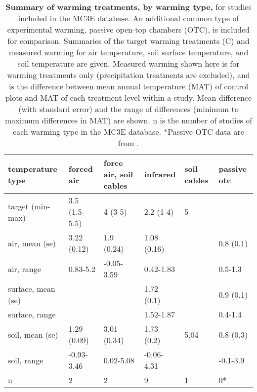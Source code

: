 \documentclass{article}
\begin{document}
\clearpage
\begin{footnotesize} 

\begin{table}[ht]
\centering
\caption{\textbf{Summary of warming treatments, by warming type,} for studies included in the MC3E database. An additional common type of experimental warming, passive open-top chambers (OTC), is included for comparison. Summaries of the target warming treatments (\degree C) and measured warming for air temperature, soil surface temperature, and soil temperature are given. Measured warming shown here is for warming treatments only (precipitation treatments are excluded), and is the difference between mean annual temperature (MAT) of control plots and MAT of each treatment level within a study. Mean difference (with standard error) and the range of differences (minimum to maximum differences in MAT) are shown. n is the number of studies of each warming type in the MC3E database. *Passive OTC data are from \cite{bokhorst2013}.} 
\label{tab:warmtreats}
\begingroup\footnotesize
\begin{tabular}{|p{}p{}p{}p{}p{}p{}|}
  \hline
temperature type & forced air & force air, soil cables & infrared & soil cables & passive otc \\ 
  \hline
target (min-max) & 3.5 (1.5-5.5) & 4 (3-5) & 2.2 (1-4) & 5 &   \\ 
  air, mean (se) & 3.22 (0.12) & 1.9 (0.24) & 1.08 (0.16) &  & 0.8 (0.1) \\ 
  air, range & 0.83-5.2 & -0.05-3.59 & 0.42-1.83 &  & 0.5-1.3 \\ 
  surface, mean (se) &  &  & 1.72 (0.1) &  & 0.9 (0.1) \\ 
  surface, range &  &  & 1.52-1.87 &  & 0.4-1.4 \\ 
  soil, mean (se) & 1.29 (0.09) & 3.01 (0.34) & 1.73 (0.2) & 5.04 & 0.8 (0.3) \\ 
  soil, range & -0.93-3.46 & 0.02-5.08 & -0.06-4.31 &   & -0.1-3.9 \\ 
  n & 2 & 2 & 9 & 1 & 0* \\ 
   \hline
\end{tabular}
\endgroup
\end{table}\end{footnotesize} 
\clearpage
\end{document}
